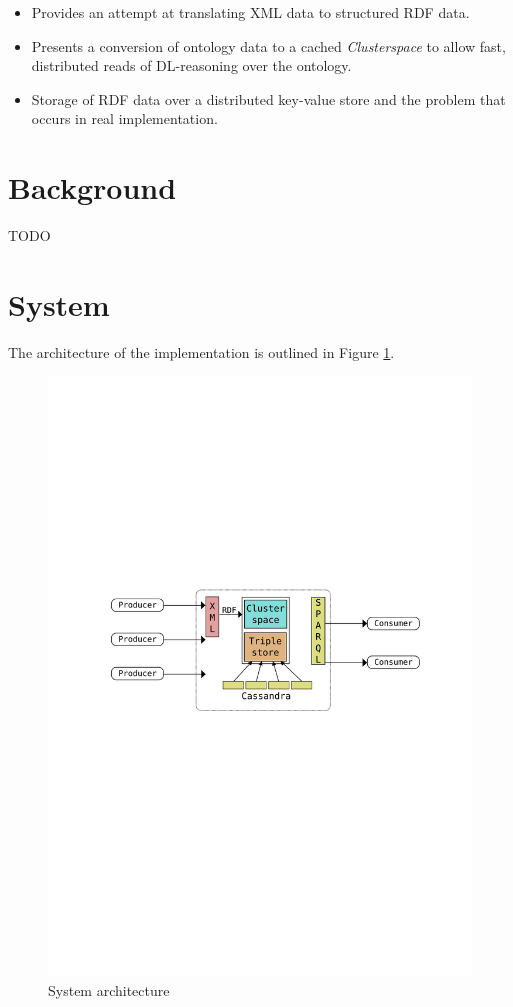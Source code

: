 \documentclass[journal]{IEEEtran}
\begin{document}
\begin{itemize}
    \item Provides an attempt at translating XML data to structured RDF data.
    \item Presents a conversion of ontology data to a cached \emph{Clusterspace} to
        allow fast, distributed reads of DL-reasoning over the ontology.
    \item Storage of RDF data over a distributed key-value store and the
        problem that occurs in real implementation.
\end{itemize}

\section{Background}
\label{sec:background}

TODO

\section{System}
The architecture of the implementation is outlined in Figure \ref{fig:architecture}.

\begin{figure}
    \centering
    \includegraphics[scale=0.5]{images/architecture}
    \caption{System architecture}
    \label{fig:architecture}
\end{figure}
\end{document}
